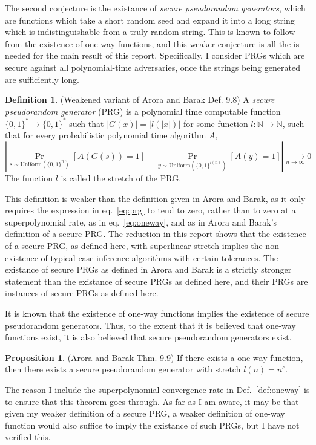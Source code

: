 \documentclass{article}
\theoremstyle{definition}
\newtheorem{defn}{Definition}
\newtheorem{prop}[thm]{Proposition}
\theoremstyle{remark}
\begin{document}
The second conjecture is the existance of \textit{secure pseudorandom generators}, which are functions which take a short random seed and expand it into a long string which is indistinguishable from a truly random string.
This is known to follow from the existence of one-way functions, and this weaker conjecture is all the is needed for the main result of this report.
Specifically, I consider PRGs which are secure against all polynomial-time adversaries, once the strings being generated are sufficiently long.

\begin{defn}{(Weakened variant of Arora and Barak Def. 9.8)}
A \textit{secure pseudorandom generator} (PRG) is a polynomial time computable function $\{0, 1\}^* \to \{0, 1\}^*$ such that $|G(x)| = |l(|x|)|$ for some function $l : \mathbb{N} \to \mathbb{N}$, such that for every probabilistic polynomial time algorithm $A$,
\begin{equation} \label{eq:prg}
|\Pr_{s \sim \text{Uniform}(\{0, 1\}^n)}[A(G(s)) = 1] - \Pr_{y \sim \text{Uniform}(\{0, 1\}^{l(n)})}[A(y) = 1]| \underset{n \to \infty}{\to} 0
\end{equation}
The function $l$ is called the stretch of the PRG.
\end{defn}
This definition is weaker than the definition given in Arora and Barak, as it only requires the expression in eq.~\ref{eq:prg} to tend to zero, rather than to zero at a superpolynomial rate, as in eq.~\ref{eq:oneway}, and as in Arora and Barak's definition of a secure PRG.
The reduction in this report shows that the existence of a secure PRG, as defined here, with superlinear stretch implies the non-existence of typical-case inference algorithms with certain tolerances.
The existance of secure PRGs as defined in Arora and Barak is a strictly stronger statement than the existance of secure PRGs as defined here, and their PRGs are instances of secure PRGs as defined here.

It is known that the existence of one-way functions implies the existence of secure pseudorandom generators.
Thus, to the extent that it is believed that one-way functions exist, it is also believed that secure pseudorandom generators exist.
\begin{prop}{(Arora and Barak Thm. 9.9)} \label{prop:oneway_to_prg}
If there exists a one-way function, then there exists a secure pseudorandom generator with stretch $l(n) = n^c$.
\end{prop}
The reason I include the superpolynomial convergence rate in Def.~\ref{def:oneway} is to ensure that this theorem goes through.
As far as I am aware, it may be that given my weaker definition of a secure PRG, a weaker definition of one-way function would also suffice to imply the existance of such PRGs, but I have not verified this.
\end{document}
